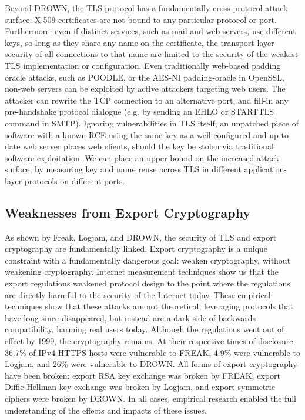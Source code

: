Beyond DROWN, the TLS protocol has a fundamentally cross-protocol attack
surface. X.509 certificates are not bound to any particular protocol or port.
Furthermore, even if distinct services, such as mail and web servers, use
different keys, so long as they share any name on the certificate, the
transport-layer security of all connections to that name are limited to the
security of the weakest TLS implementation or configuration. Even traditionally
web-based padding oracle attacks, such as POODLE, or the AES-NI padding-oracle
in OpenSSL, non-web servers can be exploited by active attackers targeting web
users. The attacker can rewrite the TCP connection to an alternative port, and
fill-in any pre-handshake protocol dialogue (e.g. by sending an EHLO or
STARTTLS command in SMTP). Ignoring vulnerabilities in TLS itself, an unpatched
piece of software with a known RCE using the same key as a well-configured and
up to date web server places web clients, should the key be stolen via
traditional software exploitation. We can place an upper bound on the increased
attack surface, by measuring key and name reuse across TLS in different
application-layer protocols on different ports.

\subsection{Weaknesses from Export Cryptography}

As shown by Freak, Logjam, and DROWN, the security of TLS and export
cryptography are fundamentally linked. Export cryptography is a unique
constraint with a fundamentally dangerous goal: weaken cryptography, without
weakening cryptography. Internet measurement techniques show us that the export
regulations weakened protocol design to the point where the regulations are
directly harmful to the security of the Internet today. These empirical
techniques show that these attacks are not theoretical, leveraging protocols
that have long-since disappeared, but instead are a dark side of backwards
compatibility, harming real users today. Although the regulations went out of
effect by 1999, the cryptography remains. At their respective times of
disclosure, 36.7\% of IPv4 HTTPS hosts were vulnerable to FREAK, 4.9\% were
vulnerable to Logjam, and 26\% were vulnerable to DROWN. All forms of export
cryptography have been broken: export RSA key exchange was broken by FREAK,
export Diffie-Hellman key exchange was broken by Logjam, and export symmetric
ciphers were broken by DROWN. In all cases, empirical research enabled the full
understanding of the effects and impacts of these issues.

